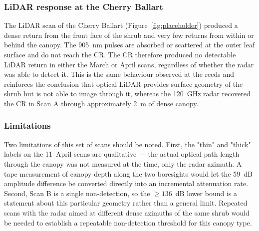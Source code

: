 \subsubsection{LiDAR response at the Cherry Ballart}

The LiDAR scan of the Cherry Ballart (Figure~\ref{fig:placeholder}) produced a dense return from the front face of the shrub and very few returns from within or behind the canopy. The 905~nm pulses are absorbed or scattered at the outer leaf surface and do not reach the CR. The CR therefore produced no detectable LiDAR return in either the March or April scans, regardless of whether the radar was able to detect it. This is the same behaviour observed at the reeds and reinforces the conclusion that optical LiDAR provides surface geometry of the shrub but is not able to image through it, whereas the 120~GHz radar recovered the CR in Scan A through approximately 2~m of dense canopy.

\subsubsection{Limitations}

Two limitations of this set of scans should be noted. First, the "thin" and "thick" labels on the 11~April scans are qualitative --- the actual optical path length through the canopy was not measured at the time, only the radar azimuth. A tape measurement of canopy depth along the two boresights would let the 59~dB amplitude difference be converted directly into an incremental attenuation rate. Second, Scan B is a single non-detection, so the $\geq 136$~dB lower bound is a statement about this particular geometry rather than a general limit. Repeated scans with the radar aimed at different dense azimuths of the same shrub would be needed to establish a repeatable non-detection threshold for this canopy type.
